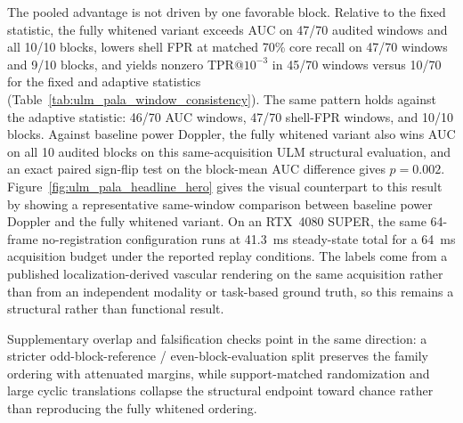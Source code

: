 \documentclass[11pt]{article}
\newif\ifPAPERONLY
\begin{document}
\ifPAPERONLY
The pooled advantage is not driven by one favorable block. Relative to the fixed statistic, the fully whitened variant exceeds AUC on 47/70 audited windows and all 10/10 blocks, lowers shell FPR at matched 70\% core recall on 47/70 windows and 9/10 blocks, and yields nonzero TPR@$10^{-3}$ in 45/70 windows versus 10/70 for the fixed and adaptive statistics. Against baseline power Doppler, the fully whitened variant also wins AUC on all 10 audited blocks on this same-acquisition ULM structural evaluation, and an exact paired sign-flip test on the block-mean AUC difference gives $p = 0.002$. Figure~\ref{fig:ulm_pala_headline_hero} gives the visual counterpart to this result. On an RTX~4080 SUPER, the same 64-frame no-registration configuration runs at 41.3~ms steady-state total for a 64~ms acquisition budget under the reported replay conditions.
\else
The pooled advantage is not driven by one favorable block. Relative to the fixed statistic, the fully whitened variant exceeds AUC on 47/70 audited windows and all 10/10 blocks, lowers shell FPR at matched 70\% core recall on 47/70 windows and 9/10 blocks, and yields nonzero TPR@$10^{-3}$ in 45/70 windows versus 10/70 for the fixed and adaptive statistics (Table~\ref{tab:ulm_pala_window_consistency}). The same pattern holds against the adaptive statistic: 46/70 AUC windows, 47/70 shell-FPR windows, and 10/10 blocks. Against baseline power Doppler, the fully whitened variant also wins AUC on all 10 audited blocks on this same-acquisition ULM structural evaluation, and an exact paired sign-flip test on the block-mean AUC difference gives $p = 0.002$. Figure~\ref{fig:ulm_pala_headline_hero} gives the visual counterpart to this result by showing a representative same-window comparison between baseline power Doppler and the fully whitened variant. On an RTX~4080 SUPER, the same 64-frame no-registration configuration runs at 41.3~ms steady-state total for a 64~ms acquisition budget under the reported replay conditions. The labels come from a published localization-derived vascular rendering on the same acquisition rather than from an independent modality or task-based ground truth, so this remains a structural rather than functional result.
\fi

Supplementary overlap and falsification checks point in the same direction: a stricter odd-block-reference / even-block-evaluation split preserves the family ordering with attenuated margins, while support-matched randomization and large cyclic translations collapse the structural endpoint toward chance rather than reproducing the fully whitened ordering.
\end{document}
